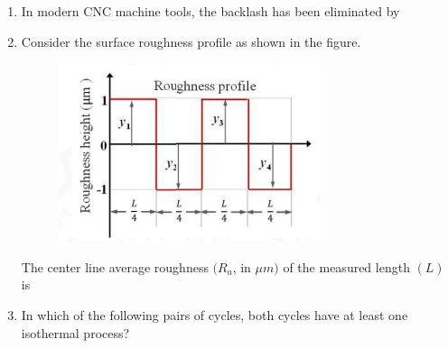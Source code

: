 \documentclass[journal]{IEEEtran}
\begin{document}
\begin{enumerate}
\hfill{}

\item In modern CNC machine tools, the backlash has been eliminated by

\begin{enumerate}
\end{enumerate}

\hfill{}

\item Consider the surface roughness profile as shown in the figure.
\begin{figure}[h]
\centering
\includegraphics[width=0.5\columnwidth]{Figs/image (43).png}
\caption*{}
\label{fig:10}
\end{figure}
\newpage
The center line average roughness $(R_a$, in $\mu m)$ of the measured length $(L)$ is

\begin{enumerate}
\end{enumerate}

\hfill{}

\item In which of the following pairs of cycles, both cycles have at least one isothermal process?

\begin{enumerate}
\end{enumerate}


\end{enumerate}
\end{document}
